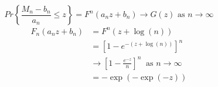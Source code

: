 \documentclass[
  letterpaper,
  DIV=11,
  numbers=noendperiod,
  oneside]{scrartcl}
\begin{document}
\begin{tcolorbox}
\[Pr\left\{\frac{M_n - b_n}{a_n} \leq z \right\} = F^n(a_nz + b_n) \rightarrow G(z) \text{ as } n \rightarrow \infty\]
\[\begin{split} F_n(a_nz + b_n) & = F^n(z+\log(n))\\ & = [1 - e^{-(z+\log(n))}]^n\\ &\rightarrow \left[1-\frac{e^{-z}}{n} \right]^n \ \text{ as } n \rightarrow \infty\\ &= -\exp(-\exp(-z))\end{split}\]

{}

\end{tcolorbox}
\end{document}
